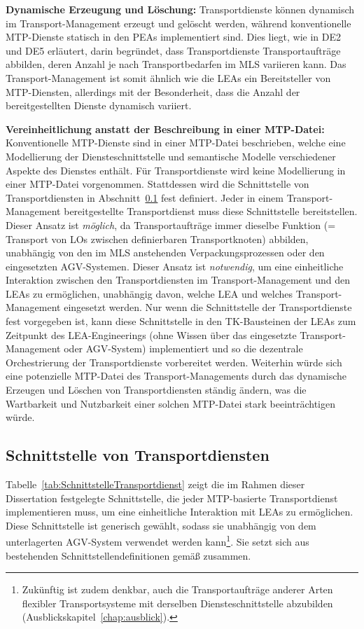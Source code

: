 \textbf{Dynamische Erzeugung und Löschung:} Transportdienste können dynamisch im Transport-Management erzeugt und gelöscht werden, während konventionelle MTP-Dienste statisch in den PEAs implementiert sind. Dies liegt, wie in DE2 und DE5 erläutert, darin begründet, dass Transportdienste Transportaufträge abbilden, deren Anzahl je nach Transportbedarfen im MLS variieren kann. Das Transport-Management ist somit ähnlich wie die LEAs ein Bereitsteller von MTP-Diensten, allerdings mit der Besonderheit, dass die Anzahl der bereitgestellten Dienste dynamisch variiert.

\textbf{Vereinheitlichung anstatt der Beschreibung in einer MTP-Datei:} Konventionelle MTP-Dienste sind in einer MTP-Datei beschrieben, welche eine Modellierung der Diensteschnittstelle und semantische Modelle verschiedener Aspekte des Dienstes enthält. Für Transportdienste wird keine Modellierung in einer MTP-Datei vorgenommen. Stattdessen wird die Schnittstelle von Transportdiensten in Abschnitt~\ref{subsec:SchnittstelleTransportdienst} fest definiert. Jeder in einem Transport-Management bereitgestellte Transportdienst muss diese Schnittstelle bereitstellen. Dieser Ansatz ist \emph{möglich}, da Transportaufträge immer dieselbe Funktion (= Transport von LOs zwischen definierbaren Transportknoten) abbilden, unabhängig von den im MLS anstehenden Verpackungsprozessen oder den eingesetzten AGV-Systemen. Dieser Ansatz ist \emph{notwendig}, um eine einheitliche Interaktion zwischen den Transportdiensten im Transport-Management und den LEAs zu ermöglichen, unabhängig davon, welche LEA und welches Transport-Management eingesetzt werden. Nur wenn die Schnittstelle der Transportdienste fest vorgegeben ist, kann diese Schnittstelle in den TK-Bausteinen der LEAs zum Zeitpunkt des LEA-Engineerings (ohne Wissen über das eingesetzte Transport-Management oder AGV-System) implementiert und so die dezentrale Orchestrierung der Transportdienste vorbereitet werden. Weiterhin würde sich eine potenzielle MTP-Datei des Transport-Managements durch das dynamische Erzeugen und Löschen von Transportdiensten ständig ändern, was die Wartbarkeit und Nutzbarkeit einer solchen MTP-Datei stark beeinträchtigen würde.

\subsection{Schnittstelle von Transportdiensten}
\label{subsec:SchnittstelleTransportdienst}

Tabelle~\ref{tab:SchnittstelleTransportdienst} zeigt die im Rahmen dieser Dissertation festgelegte Schnittstelle, die jeder MTP-basierte Transportdienst implementieren muss, um eine einheitliche Interaktion mit LEAs zu ermöglichen. Diese Schnittstelle ist generisch gewählt, sodass sie unabhängig von dem unterlagerten AGV-System verwendet werden kann\footnote{Zukünftig ist zudem denkbar, auch die Transportaufträge anderer Arten flexibler Transportsysteme mit derselben Diensteschnittstelle abzubilden (Ausblickskapitel~\ref{chap:ausblick}).}. Sie setzt sich aus bestehenden Schnittstellendefinitionen gemäß \cite{PNO.2025.Part4} zusammen.

